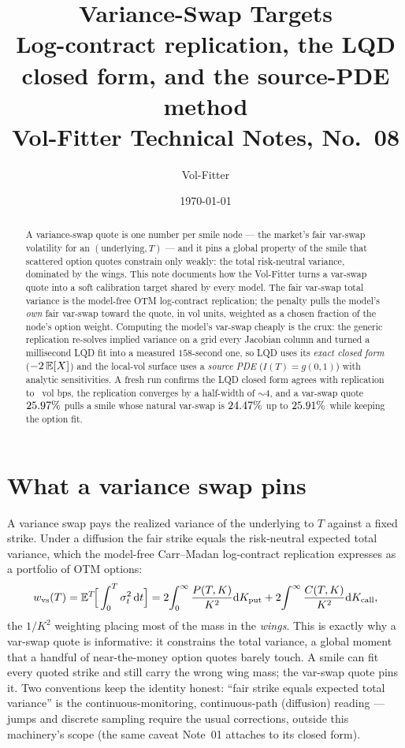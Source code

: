 \documentclass[11pt]{article}
\title{\textbf{Variance-Swap Targets}\\[2pt]
\large Log-contract replication, the LQD closed form, and the source-PDE method\\[2pt]
\normalsize Vol-Fitter Technical Notes, No.~08}
\author{Vol-Fitter}
\date{\today}
\begin{document}
\maketitle


\begin{abstract}
A variance-swap quote is one number per smile node --- the market's fair var-swap
volatility for an $(\text{underlying},T)$ --- and it pins a global property of the
smile that scattered option quotes constrain only weakly: the total risk-neutral
variance, dominated by the wings. This note documents how the Vol-Fitter turns a
var-swap quote into a soft calibration target shared by every model. The fair
var-swap total variance is the model-free OTM log-contract replication; the
penalty pulls the model's \emph{own} fair var-swap toward the quote, in vol units,
weighted as a chosen fraction of the node's option weight. Computing the model's
var-swap cheaply is the crux: the generic replication re-solves implied variance on
a grid every Jacobian column and turned a millisecond LQD fit into a measured
$158$-second one, so LQD uses
its \emph{exact closed form} ($-2\,\mathbb{E}[X]$) and the local-vol surface uses a
\emph{source PDE} ($I(T)=g(0,1)$) with analytic sensitivities. A fresh run confirms
the LQD closed form agrees with replication to \vsagreebp\ vol bps, the replication
converges by a half-width of $\sim4$, and a var-swap quote $25.97\%$ pulls a
smile whose natural var-swap is $24.47\%$ up to $25.91\%$ while keeping the
option fit.
\end{abstract}

\tableofcontents
\newpage

\section{What a variance swap pins}
\label{sec:what}

A variance swap pays the realized variance of the underlying to $T$ against a
fixed strike. Under a diffusion the fair strike equals the risk-neutral expected
total variance, which the model-free Carr--Madan log-contract replication expresses
as a portfolio of OTM options:
\begin{equation}
w_{\text{vs}}(T)=\mathbb{E}^T\!\Big[\int_0^T\sigma_t^2\,\mathrm{d} t\Big]
=2\!\int_0^\infty\frac{P(T,K)}{K^2}\mathrm{d} K_{\text{put}}
+2\!\int^\infty\frac{C(T,K)}{K^2}\mathrm{d} K_{\text{call}},
\label{eq:logcontract}
\end{equation}
the $1/K^2$ weighting placing most of the mass in the \emph{wings}. This is exactly
why a var-swap quote is informative: it constrains the total variance, a global
moment that a handful of near-the-money option quotes barely touch. A smile can fit
every quoted strike and still carry the wrong wing mass; the var-swap quote pins it.
Two conventions keep the identity honest: ``fair strike equals expected total
variance'' is the continuous-monitoring, continuous-path (diffusion) reading
--- jumps and discrete sampling require the usual corrections, outside this
machinery's scope (the same caveat Note~01 attaches to its closed form).
\end{document}

